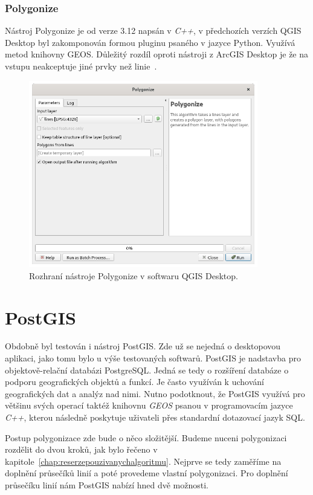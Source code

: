 \subsubsection{Polygonize}
Nástroj Polygonize je od verze 3.12 napsán v \textit{C++}, v
předchozích verzích QGIS Desktop byl zakomponován formou pluginu
psaného v jazyce Python. Využívá metod knihovny GEOS. Důležitý rozdíl
oproti nástroji z ArcGIS Desktop je že na vstupu neakceptuje jiné
prvky než linie~\cite{QGIS_software}.

\begin{figure}[h]
  \centering
  \includegraphics[width=10cm]{./pictures/5_1/polygonize.png}
  \caption{Rozhraní nástroje Polygonize v softwaru QGIS Desktop.}
  \label{fig:polygonize}
\end{figure}

\section{PostGIS}
Obdobně byl testován i nástroj PostGIS. Zde už se nejedná o
desktopovou aplikaci, jako tomu bylo u výše testovaných
softwarů. PostGIS je nadstavba pro objektově-relační databázi
PostgreSQL. Jedná se tedy o rozšíření databáze o podporu
geo\-grafických objektů a funkcí. Je často využíván k uchování
geografických dat a analýz nad nimi. Nutno podotknout, že PostGIS
využívá pro většinu svých o\-pe\-ra\-cí taktéž knihovnu \textit{GEOS}
psanou v programovacím jazyce \textit{C++}, kterou následně poskytuje
uživateli přes standardní dotazovací jazyk SQL.
	
Postup polygonizace zde bude o něco složitější. Budeme nuceni
polygonizaci rozdělit do dvou kroků, jak bylo řečeno v
kapitole~\ref{chap:reserzepouzivanychalgoritmu}. Nejprve se tedy
zaměříme na doplnění průsečíků linií a poté provedeme vlastní
polygonizaci. Pro doplnění průsečíku linií nám PostGIS nabízí hned dvě
možnosti.
	
